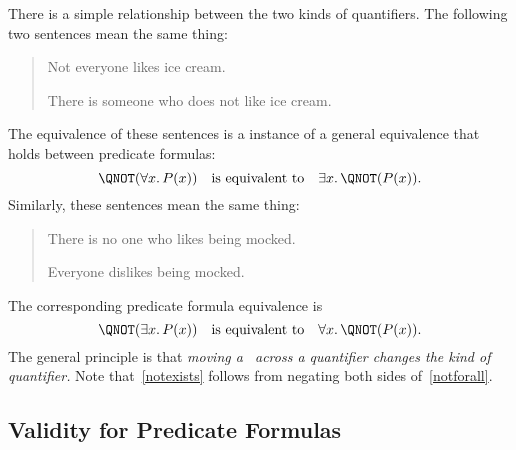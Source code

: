 There is a simple relationship between the two kinds of quantifiers.  The
following two sentences mean the same thing:
%
\begin{quote}

Not everyone likes ice cream.

There is someone who does not like ice cream.

\end{quote}
The equivalence of these sentences is a instance of a general
equivalence that holds between predicate formulas:
%
\begin{equation}\label{notforall}
\QNOT(\forall x.\, P(x))
\quad \text{is equivalent to} \quad
\exists x.\, \QNOT(P(x)).
\end{equation}
%
Similarly, these sentences mean the same thing:
%
\begin{quote}
There is no one who likes being mocked.

Everyone dislikes being mocked.
\end{quote}
The corresponding predicate formula equivalence is
\begin{equation}\label{notexists}
\QNOT(\exists x.\, P(x))
\quad \text{is equivalent to} \quad
\forall x.\, \QNOT(P(x)).
\end{equation}
The general principle is that \emph{moving a \QNOT\ across a
  quantifier changes the kind of quantifier.}  Note that~\eqref{notexists}
follows from negating both sides of~\eqref{notforall}.

\iffalse
Logicians have worked very hard to define strict rules for the
use of logic notation so that ideas can be expressed with absolute rigor.
It's all quite charming and clever.  However, the sad irony is that
applied mathematicans usually use their beloved notation as a crude
shorthand, breaking the rules and abusing the notation willy-nilly---sort
of like pounding nails with fine china.
\fi

\subsection{Validity for Predicate Formulas}

\iffalse
A propositional formula is called \emph{valid} when it evaluates to \true\
no matter what truth values are assigned to the individual propositional
variables.  For example, the propositional version of the \idx{Distributive Law}
is that $P \QAND (Q \QOR R)$ is equivalent to $(P \QAND Q) \QOR (P \QAND
R)$.  This is the same as saying that
\[
[P \QAND (Q \QOR R)] \QIFF [(P \QAND Q) \QOR (P \QAND R)]
\]
is valid.
\fi

